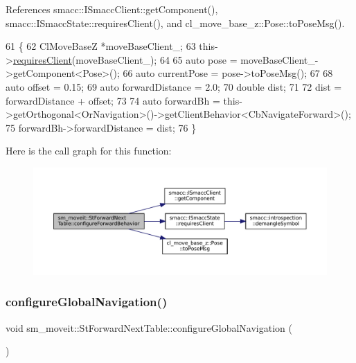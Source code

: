 References smacc\+::\+I\+Smacc\+Client\+::get\+Component(), smacc\+::\+I\+Smacc\+State\+::requires\+Client(), and cl\+\_\+move\+\_\+base\+\_\+z\+::\+Pose\+::to\+Pose\+Msg().


\begin{DoxyCode}
61   \{
62     ClMoveBaseZ *moveBaseClient\_;
63     this->\hyperlink{classsmacc_1_1ISmaccState_a7f95c9f0a6ea2d6f18d1aec0519de4ac}{requiresClient}(moveBaseClient\_);
64 
65     \textcolor{keyword}{auto} pose = moveBaseClient\_->getComponent<Pose>();
66     \textcolor{keyword}{auto} currentPose = pose->toPoseMsg();
67 
68     \textcolor{keyword}{auto} offset = 0.15;
69     \textcolor{keyword}{auto} forwardDistance = 2.0;
70     \textcolor{keywordtype}{double} dist;
71     
72     dist = forwardDistance + offset;
73 
74     \textcolor{keyword}{auto} forwardBh = this->getOrthogonal<OrNavigation>()->getClientBehavior<CbNavigateForward>();
75     forwardBh->forwardDistance = dist;
76   \}
\end{DoxyCode}
Here is the call graph for this function\+:
\nopagebreak
\begin{figure}[H]
\begin{center}
\leavevmode
\includegraphics[width=350pt]{structsm__moveit_1_1StForwardNextTable_a6ecfa1c16ac130f4063cea5a90325b66_cgraph}
\end{center}
\end{figure}
\mbox{\label{structsm__moveit_1_1StForwardNextTable_ac3b63f25fad5cecd8faa51b427719d07}} 
\subsubsection{\texorpdfstring{configure\+Global\+Navigation()}{configureGlobalNavigation()}}
{\footnotesize\ttfamily void sm\+\_\+moveit\+::\+St\+Forward\+Next\+Table\+::configure\+Global\+Navigation (\begin{DoxyParamCaption}{ }\end{DoxyParamCaption})\hspace{0.3cm}{\ttfamily [inline]}}



